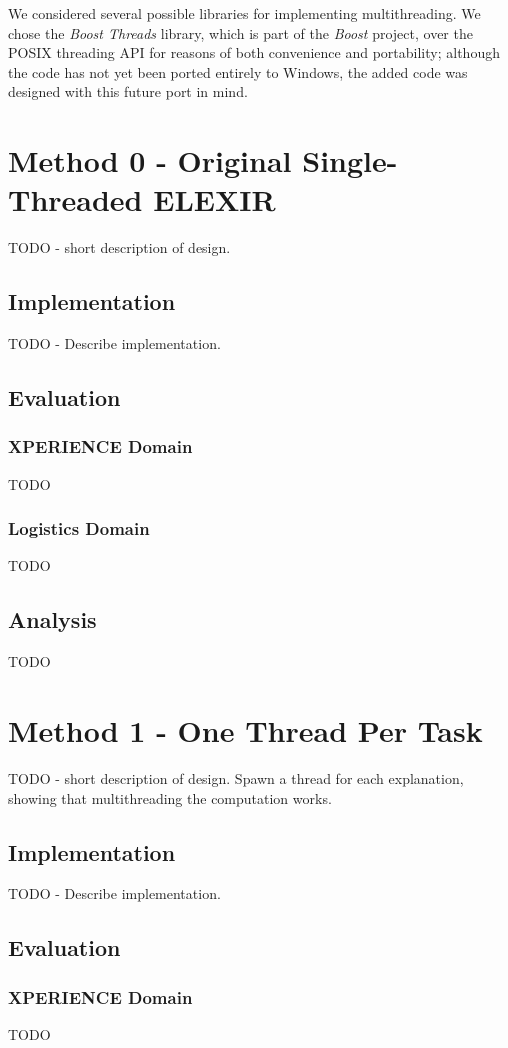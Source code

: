 \documentclass[12pt,twoside,abbrevs,msc,ai,notimes,logo,sansheadings]{infthesis}
\begin{document}
  We considered several possible libraries for implementing multithreading. We chose the \emph{Boost Threads} library, which is part of the \emph{Boost} project, over the POSIX threading API for reasons of both convenience and portability; although the code has not yet been ported entirely to Windows, the added code was designed with this future port in mind.
  
  \chapter {Method 0 - Original Single-Threaded ELEXIR}
  TODO - short description of design.
  \section {Implementation}
  TODO - Describe implementation.
  \section{Evaluation}
  \subsection{XPERIENCE Domain}
  TODO
  \subsection{Logistics Domain}
  TODO
  \section{Analysis}
  TODO
  
  \chapter {Method 1 - One Thread Per Task}
  TODO - short description of design. Spawn a thread for each explanation, showing that multithreading the computation works.
  \section {Implementation}
  TODO - Describe implementation.
  \section{Evaluation}
  \subsection{XPERIENCE Domain}
  TODO
\end{document}
